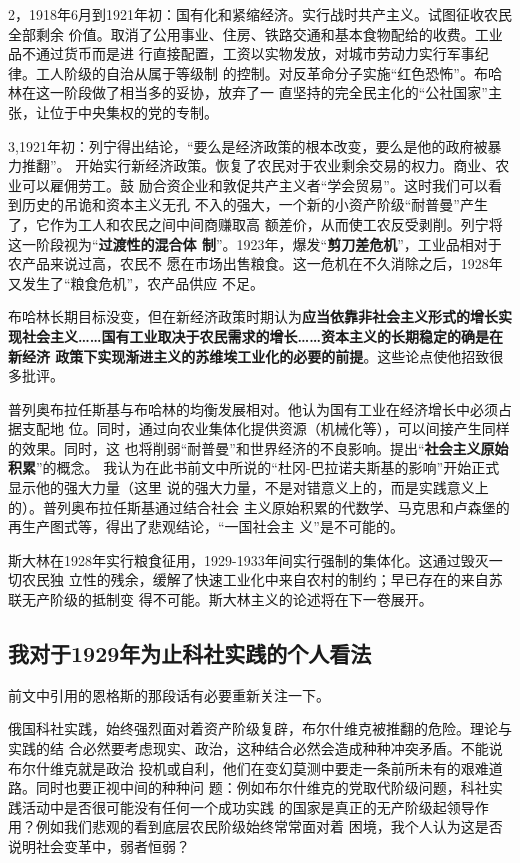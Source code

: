 2，1918年6月到1921年初：国有化和紧缩经济。实行战时共产主义。试图征收农民全部剩余
价值。取消了公用事业、住房、铁路交通和基本食物配给的收费。工业品不通过货币而是进
行直接配置，工资以实物发放，对城市劳动力实行军事纪律。工人阶级的自治从属于等级制
的控制。对反革命分子实施“红色恐怖”。布哈林在这一阶段做了相当多的妥协，放弃了一
直坚持的完全民主化的“公社国家”主张，让位于中央集权的党的专制。

3,1921年初：列宁得出结论，“要么是经济政策的根本改变，要么是他的政府被暴力推翻”。
开始实行新经济政策。恢复了农民对于农业剩余交易的权力。商业、农业可以雇佣劳工。鼓
励合资企业和敦促共产主义者“学会贸易”。这时我们可以看到历史的吊诡和资本主义无孔
不入的强大，一个新的小资产阶级“耐普曼”产生了，它作为工人和农民之间中间商赚取高
额差价，从而使工农反受剥削。列宁将这一阶段视为“\textbf{过渡性的混合体
  制}”。1923年，爆发“\textbf{剪刀差危机}”，工业品相对于农产品来说过高，农民不
愿在市场出售粮食。这一危机在不久消除之后，1928年又发生了“粮食危机”，农产品供应
不足。

布哈林长期目标没变，但在新经济政策时期认为\textbf{应当依靠非社会主义形式的增长实
  现社会主义……国有工业取决于农民需求的增长……资本主义的长期稳定的确是在新经济
  政策下实现渐进主义的苏维埃工业化的必要的前提}。这些论点使他招致很多批评。

普列奥布拉任斯基与布哈林的均衡发展相对。他认为国有工业在经济增长中必须占据支配地
位。同时，通过向农业集体化提供资源（机械化等），可以间接产生同样的效果。同时，这
也将削弱“耐普曼”和世界经济的不良影响。提出“\textbf{社会主义原始积累}”的概念。
我认为在此书前文中所说的“杜冈-巴拉诺夫斯基的影响”开始正式显示他的强大力量（这里
说的强大力量，不是对错意义上的，而是实践意义上的）。普列奥布拉任斯基通过结合社会
主义原始积累的代数学、马克思和卢森堡的再生产图式等，得出了悲观结论，“一国社会主
义”是不可能的。

斯大林在1928年实行粮食征用，1929-1933年间实行强制的集体化。这通过毁灭一切农民独
立性的残余，缓解了快速工业化中来自农村的制约；早已存在的来自苏联无产阶级的抵制变
得不可能。斯大林主义的论述将在下一卷展开。

\subsection{我对于1929年为止科社实践的个人看法}

前文中引用的恩格斯的那段话有必要重新关注一下。

俄国科社实践，始终强烈面对着资产阶级复辟，布尔什维克被推翻的危险。理论与实践的结
合必然要考虑现实、政治，这种结合必然会造成种种冲突矛盾。不能说布尔什维克就是政治
投机或自利，他们在变幻莫测中要走一条前所未有的艰难道路。同时也要正视中间的种种问
题：例如布尔什维克的党取代阶级问题，科社实践活动中是否很可能没有任何一个成功实践
的国家是真正的无产阶级起领导作用？例如我们悲观的看到底层农民阶级始终常常面对着
困境，我个人认为这是否说明社会变革中，弱者恒弱？

